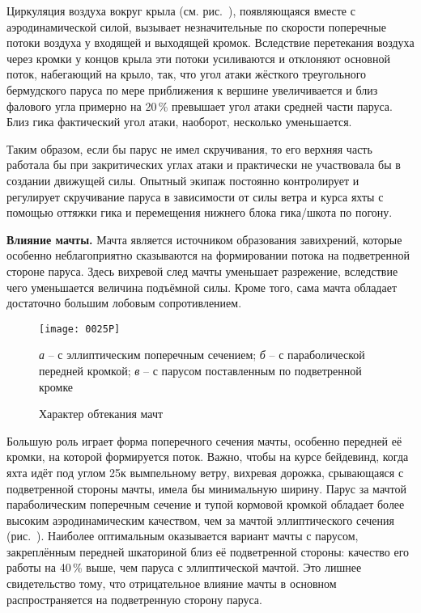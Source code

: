 Циркуляция воздуха вокруг крыла (см. рис.~), появляющаяся
вместе с аэродинамической силой, вызывает незначительные по скорости
поперечные потоки воздуха  у входящей и выходящей
кромок. Вследствие перетекания воздуха через кромки у концов крыла эти
потоки усиливаются и отклоняют основной поток, набегающий на крыло,
так, что угол атаки жёсткого треугольного бермудского паруса по мере
приближения к вершине увеличивается и близ фалового угла примерно на
20\,\% превышает угол атаки средней части паруса. Близ гика
фактический угол атаки, наоборот, несколько уменьшается.

Таким образом, если бы парус не имел скручивания, то его верхняя часть
работала бы при закритических углах атаки и практически не участвовала
бы в создании движущей силы. Опытный экипаж постоянно контролирует и
регулирует скручивание паруса в зависимости от силы ветра и курса яхты
с помощью оттяжки гика и перемещения нижнего блока гика\-/шкота по
погону.

\textbf{Влияние мачты.} Мачта является источником образования
завихрений, которые особенно неблагоприятно сказываются на
формировании потока на подветренной стороне паруса. Здесь вихревой
след мачты уменьшает разрежение, вследствие чего уменьшается величина
подъёмной силы. Кроме того, сама мачта обладает достаточно большим
лобовым сопротивлением.

\begin{figure}[!htb]
  \centering
  \texttt{[image: 0025P]}
  \caption{Характер обтекания мачт}
  \label{fig:25}
  \small
  \centering{}
  \textit{а} \--- с эллиптическим поперечным сечением; \textit{б} \--- с параболической передней кромкой; \textit{в} \--- с парусом поставленным по подветренной кромке
\end{figure}

Большую роль играет форма поперечного сечения мачты, особенно передней
её кромки, на которой формируется поток. Важно, чтобы на курсе
бейдевинд, когда яхта идёт под углом 25\gr к вымпельному
ветру, вихревая дорожка, срывающаяся с подветренной стороны мачты,
имела бы минимальную ширину. Парус за мачтой параболическим поперечным
сечение и тупой кормовой кромкой обладает более высоким
аэродинамическим качеством, чем за мачтой эллиптического сечения
(рис.~). Наиболее оптимальным оказывается вариант мачты с
парусом, закреплённым передней шкаториной близ её подветренной
стороны: качество его работы на 40\,\% выше, чем паруса с
эллиптической мачтой. Это лишнее свидетельство тому, что отрицательное
влияние мачты в основном распространяется на подветренную сторону
паруса.

